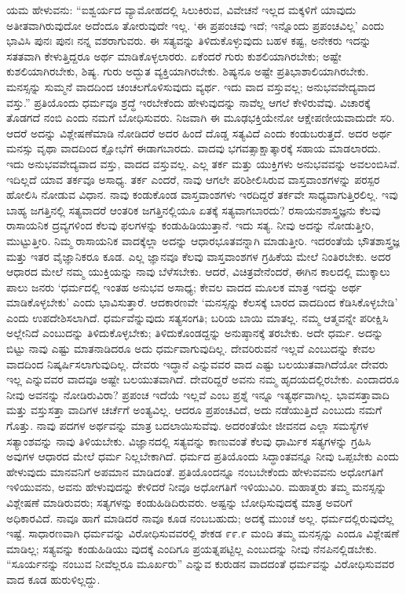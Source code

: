 ಯಮ ಹೇಳುವನು: “ಐಶ್ವರ್ಯದ ವ್ಯಾಮೋಹದಲ್ಲಿ ಸಿಲುಕಿರುವ, ವಿವೇಚನೆ ಇಲ್ಲದ ಮಕ್ಕಳಿಗೆ ಯಾವುದು ಅತೀತವಾಗಿರುವುದೋ ಅದೆಂದೂ ತೋರುವುದೇ ಇಲ್ಲ. ‘ಈ ಪ್ರಪಂಚವು ಇದೆ; ಇನ್ನೊಂದು ಪ್ರಪಂಚವಿಲ್ಲ’ ಎಂದು ಭಾವಿಸಿ ಪುನಃ ಪುನಃ ನನ್ನ ವಶರಾಗುವರು. ಈ ಸತ್ಯವನ್ನು ತಿಳಿದುಕೊಳ್ಳುವುದು ಬಹಳ ಕಷ್ಟ, ಅನೇಕರು ಇದನ್ನು ಸತತವಾಗಿ ಕೇಳುತ್ತಿದ್ದರೂ ಅರ್ಥ ಮಾಡಿಕೊಳ್ಳಲಾರರು. ಏಕೆಂದರೆ ಗುರು ಕುಶಲಿಯಾಗಿರಬೇಕು; ಅಷ್ಟೇ ಕುಶಲಿಯಾಗಿರಬೇಕು, ಶಿಷ್ಯ. ಗುರು ಅದ್ಭುತ ವ್ಯಕ್ತಿಯಾಗಿರಬೇಕು. ಶಿಷ್ಯನೂ ಅಷ್ಟೇ ಪ್ರತಿಭಾಶಾಲಿಯಾಗಿರಬೇಕು. ಮನಸ್ಸನ್ನು ಸುಮ್ಮನೆ ವಾದದಿಂದ ಚಂಚಲಗೊಳಿಸುವುದು ವ್ಯರ್ಥ. ಇದು ವಾದ ವಸ್ತುವಲ್ಲ; ಅನುಭವವೇದ್ಯವಾದ ವಸ್ತು.” ಪ್ರತಿಯೊಂದು ಧರ್ಮವೂ ಶ್ರದ್ಧೆ ಇರಬೇಕೆಂದು ಹೇಳುವುದನ್ನು ನಾವೆಲ್ಲ ಆಗಲೆ ಕೇಳಿರುವೆವು. ವಿಚಾರಕ್ಕೆ ತೊಡಗದೆ ನಂಬಿ ಎಂದು ನಮಗೆ ಬೋಧಿಸುವರು. ನಿಜವಾಗಿ ಈ ಮೂಢಭಕ್ತಿಯೇನೋ ಆಕ್ಷೇಪಣೀಯವಾದುದೇ ಸರಿ. ಆದರೆ ಅದನ್ನು ವಿಶ್ಲೇಷಣೆಮಾಡಿ ನೋಡಿದರೆ ಅದರ ಹಿಂದೆ ದೊಡ್ಡ ಸತ್ಯವಿದೆ ಎಂದು ಕಂಡುಬರುತ್ತದೆ. ಅದರ ಅರ್ಥ ಮನಸ್ಸು ವೃಥಾ ವಾದದಿಂದ ಕ್ಷೋಭೆಗೆ ಈಡಾಗಬಾರದು. ವಾದವು ಭಗವತ್ಸಾಕ್ಷಾತ್ಕಾರಕ್ಕೆ ಸಹಾಯ ಮಾಡಲಾರದು. ಇದು ಅನುಭವವೇದ್ಯವಾದ ವಸ್ತು, ವಾದದ ವಸ್ತುವಲ್ಲ. ಎಲ್ಲ ತರ್ಕ ಮತ್ತು ಯುಕ್ತಿಗಳು ಅನುಭವವನ್ನು ಅವಲಂಬಿಸಿವೆ. ಇದಿಲ್ಲದೆ ಯಾವ ತರ್ಕವೂ ಅಸಾಧ್ಯ. ತರ್ಕ ಎಂದರೆ, ನಾವು ಆಗಲೇ ಪರಿಶೀಲಿಸಿರುವ ವಾಸ್ತವಾಂಶಗಳನ್ನು ಪರಸ್ಪರ ಹೋಲಿಸಿ ನೋಡುವ ವಿಧಾನ. ನಾವು ಕಂಡುಕೊಂಡ ವಾಸ್ತವಾಂಶಗಳು ಇರದಿದ್ದರೆ ತರ್ಕವೇ ಸಾಧ್ಯವಾಗುತ್ತಿರಲಿಲ್ಲ. ಇವು ಬಾಹ್ಯ ಜಗತ್ತಿನಲ್ಲಿ ಸತ್ಯವಾದರೆ ಆಂತರಿಕ ಜಗತ್ತಿನಲ್ಲಿಯೂ ಏತಕ್ಕೆ ಸತ್ಯವಾಗಬಾರದು? ರಸಾಯನಶಾಸ್ತ್ರಜ್ಞನು ಕೆಲವು ರಾಸಾಯನಿಕ ದ್ರವ್ಯಗಳಿಂದ ಕೆಲವು ಫಲಗಳನ್ನು ಕಂಡುಹಿಡಿಯುತ್ತಾನೆ. ಇದು ಸತ್ಯ. ನೀವು ಅದನ್ನು ನೋಡುತ್ತೀರಿ, ಮುಟ್ಟುತ್ತೀರಿ. ನಿಮ್ಮ ರಾಸಾಯನಿಕ ವಾದಕ್ಕೆಲ್ಲಾ ಅದನ್ನು ಆಧಾರಭೂತವನ್ನಾಗಿ ಮಾಡುತ್ತೀರಿ. ಇದರಂತೆಯೆ ಭೌತಶಾಸ್ತ್ರಜ್ಞ ಮತ್ತು ಇತರ ವೈಜ್ಞಾನಿಕರೂ ಕೂಡ. ಎಲ್ಲ ಜ್ಞಾನವೂ ಕೆಲವು ವಾಸ್ತವಾಂಶಗಳ ಗ್ರಹಿಕೆಯ ಮೇಲೆ ನಿಂತಿರಬೇಕು. ಅದರ ಆಧಾರದ ಮೇಲೆ ನಮ್ಮ ಯುಕ್ತಿಯನ್ನು ನಾವು ಬೆಳೆಸಬೇಕು. ಆದರೆ, ವಿಚಿತ್ರವೇನೆಂದರೆ, ಈಗಿನ ಕಾಲದಲ್ಲಿ ಮುಕ್ಕಾಲು ಪಾಲು ಜನರು ‘ಧರ್ಮದಲ್ಲಿ ಇಂತಹ ಅನುಭವ ಅಸಾಧ್ಯ; ಕೇವಲ ವಾದದ ಮೂಲಕ ಮಾತ್ರ ಇದನ್ನು ಅರ್ಥ ಮಾಡಿಕೊಳ್ಳಬೇಕು’ ಎಂದು ಭಾವಿಸುತ್ತಾರೆ. ಆದಕಾರಣವೇ ‘ಮನಸ್ಸನ್ನು ಕೆಲಸಕ್ಕೆ ಬಾರದ ವಾದದಿಂದ ಕೆಡಿಸಿಕೊಳ್ಳಬೇಡಿ’ ಎಂದು ಉಪದೇಶಿಸಲಾಗಿದೆ. ಧರ್ಮವೆನ್ನುವುದು ಸತ್ಯಸಂಗತಿ; ಬರಿಯ ಬಾಯಿ ಮಾತಲ್ಲ. ನಮ್ಮ ಆತ್ಮವನ್ನೇ ಪರೀಕ್ಷಿಸಿ ಅಲ್ಲೇನಿದೆ ಎಂಬುದನ್ನು ತಿಳಿದುಕೊಳ್ಳಬೇಕು; ತಿಳಿದುಕೊಂಡದ್ದನ್ನು ಅನುಷ್ಠಾನಕ್ಕೆ ತರಬೇಕು. ಅದೇ ಧರ್ಮ. ಅದನ್ನು ಬಿಟ್ಟು ನಾವು ಎಷ್ಟು ಮಾತನಾಡಿದರೂ ಅದು ಧರ್ಮವಾಗುವುದಿಲ್ಲ. ದೇವರಿರುವನೆ ಇಲ್ಲವೆ ಎಂಬುದನ್ನು ಕೇವಲ ವಾದದಿಂದ ನಿಷ್ಕರ್ಷಿಸಲಾಗುವುದಿಲ್ಲ. ದೇವರು ಇದ್ಧಾನೆ ಎನ್ನುವವರ ವಾದ ಎಷ್ಟು ಬಲಯುತವಾಗಿದೆಯೋ ದೇವರು ಇಲ್ಲ ಎನ್ನುವವರ ವಾದವೂ ಅಷ್ಟೇ ಬಲಯುತವಾಗಿದೆ. ದೇವರಿದ್ದರೆ ಅವನು ನಮ್ಮ ಹೃದಯದಲ್ಲಿರಬೇಕು. ಎಂದಾದರೂ ನೀವು ಅವನನ್ನು ನೋಡಿರುವಿರಾ? ಪ್ರಪಂಚ ಇದೆಯೆ ಇಲ್ಲವೆ ಎಂಬ ಪ್ರಶ್ನೆ ಇನ್ನೂ ಇತ್ಯರ್ಥವಾಗಿಲ್ಲ. ಭಾವಸತ್ತಾವಾದಿ ಮತ್ತು ವಸ್ತುಸತ್ತಾ ವಾದಿಗಳ ಚರ್ಚೆಗೆ ಅಂತ್ಯವಿಲ್ಲ. ಆದರೂ ಪ್ರಪಂಚವಿದೆ, ಅದು ನಡೆಯುತ್ತಿದೆ ಎಂಬುದು ನಮಗೆ ಗೊತ್ತು. ನಾವು ಪದಗಳ ಅರ್ಥವನ್ನು ಮಾತ್ರ ಬದಲಾಯಿಸುವೆವು. ಅದರಂತೆಯೇ ಜೀವನದ ಎಲ್ಲಾ ಸಮಸ್ಯೆಗಳ ಸತ್ಯಾಂಶವನ್ನು ನಾವು ತಿಳಿಯಬೇಕು. ವಿಜ್ಞಾನದಲ್ಲಿ ಸತ್ಯವನ್ನು ಕಾಣುವಂತೆ ಕೆಲವು ಧಾರ್ಮಿಕ ಸತ್ಯಗಳನ್ನು ಗ್ರಹಿಸಿ ಅವುಗಳ ಆಧಾರದ ಮೇಲೆ ಧರ್ಮ ನಿಲ್ಲಬೇಕಾಗಿದೆ. ಧರ್ಮದ ಪ್ರತಿಯೊಂದು ಸಿದ್ಧಾಂತವನ್ನೂ ನೀವು ಒಪ್ಪಬೇಕು ಎಂದು ಹೇಳುವುದು ಮಾನವನಿಗೆ ಅಪಮಾನ ಮಾಡಿದಂತೆ. ಪ್ರತಿಯೊಂದನ್ನೂ ನಂಬಬೇಕೆಂದು ಹೇಳುವವನು ಅಧೋಗತಿಗೆ ಇಳಿಯುವನು, ಅವನು ಹೇಳುವುದನ್ನು ಕೇಳಿದರೆ ನೀವೂ ಅಧೋಗತಿಗೆ ಇಳಿಯುವಿರಿ. ಮಹಾತ್ಮರು ತಮ್ಮ ಮನಸ್ಸನ್ನು ವಿಶ್ಲೇಷಣೆ ಮಾಡಿರುವರು; ಸತ್ಯಗಳನ್ನು ಕಂಡುಹಿಡಿದಿರುವರು. ಅಷ್ಟನ್ನು ಬೋಧಿಸುವುದಕ್ಕೆ ಮಾತ್ರ ಅವರಿಗೆ ಅಧಿಕಾರವಿದೆ. ನಾವೂ ಹಾಗೆ ಮಾಡಿದರೆ ನಾವೂ ಕೂಡ ನಂಬಬಹುದು; ಅದಕ್ಕೆ ಮುಂಚೆ ಅಲ್ಲ. ಧರ್ಮದಲ್ಲಿರುವುದೆಲ್ಲ ಇಷ್ಟೆ. ಸಾಧಾರಣವಾಗಿ ಧರ್ಮವನ್ನು ವಿರೋಧಿಸುವವರಲ್ಲಿ ಶೇಕಡ ೯೯.೯ ಮಂದಿ ತಮ್ಮ ಮನಸ್ಸನ್ನು ಎಂದೂ ವಿಶ್ಲೇಷಣೆ ಮಾಡಿಲ್ಲ; ಸತ್ಯವನ್ನು ಕಂಡುಹಿಡಿಯು ವುದಕ್ಕೆ ಎಂದಿಗೂ ಪ್ರಯತ್ನಪಟ್ಟಿಲ್ಲ ಎಂಬುದನ್ನು ನೀವು ನೆನಪಿನಲ್ಲಿಡಬೇಕು. “ಸೂರ್ಯನನ್ನು ನಂಬುವ ನೀವೆಲ್ಲರೂ ಮೂರ್ಖರು” ಎನ್ನುವ ಕುರುಡನ ವಾದದಂತೆ ಧರ್ಮವನ್ನು ವಿರೋಧಿಸುವವರ ವಾದ ಕೂಡ ಹುರುಳಿಲ್ಲದ್ದು.

